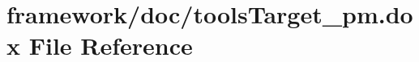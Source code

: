 \hypertarget{tools_target__pm_8dox}{}\section{framework/doc/tools\+Target\+\_\+pm.dox File Reference}
\label{tools_target__pm_8dox}
